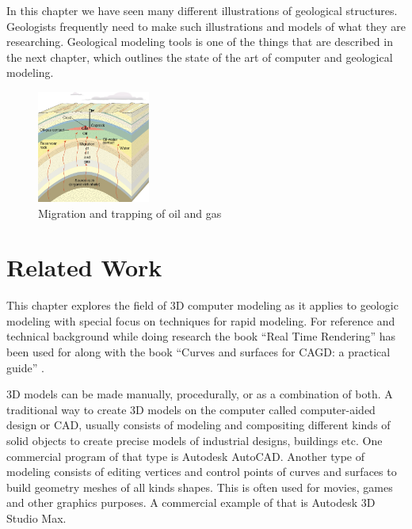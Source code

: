 \documentclass[a4paper,12pt]{report}
\begin{document}
In this chapter we have seen many different illustrations of geological structures. Geologists frequently need to make such illustrations and models of what they are researching. Geological modeling tools is one of the things that are described in the next chapter, which outlines the state of the art of computer and geological modeling.
 \begin{figure}
  
 \begin{center}
    \includegraphics[width=0.33\textwidth]{thesis/geo/english/Antiformfelle.jpg}
  \end{center}
  \caption{Migration and trapping of oil and gas}
  \label{fig:oilMigrate}
 \end{figure}




\clearpage
\chapter{Related Work}
\label{sec:star}

This chapter explores the field of 3D computer modeling as it applies to geologic modeling with special focus on techniques for rapid modeling. For reference and technical background while doing research the book ``Real Time Rendering'' \cite{moller2008real} has been used for along with the book ``Curves and surfaces for CAGD: a practical guide'' \cite{farin2001curves}.

3D models can be made manually, procedurally, or as a combination of both. A traditional way to create 3D models on the computer called computer-aided design or CAD, usually consists of modeling and compositing different kinds of solid objects to create precise models of industrial designs, buildings etc. One commercial program of that type is Autodesk AutoCAD. Another type of modeling consists of editing vertices and control points of curves and surfaces to build geometry meshes of all kinds shapes. This is often used for movies, games and other graphics purposes. A commercial example of that is Autodesk 3D Studio Max.
\end{document}
